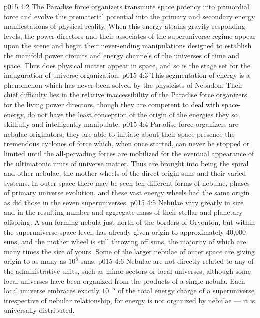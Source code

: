 \vs p015 4:2 The Paradise force organizers transmute space potency into primordial force and evolve this prematerial potential into the primary and secondary energy manifestations of physical reality. When this energy attains gravity\hyp{}responding levels, the power directors and their associates of the superuniverse regime appear upon the scene and begin their never\hyp{}ending manipulations designed to establish the manifold power circuits and energy channels of the universes of time and space. Thus does physical matter appear in space, and so is the stage set for the inauguration of universe organization.
\vs p015 4:3 This segmentation of energy is a phenomenon which has never been solved by the physicists of Nebadon. Their chief difficulty lies in the relative inaccessibility of the Paradise force organizers, for the living power directors, though they are competent to deal with space\hyp{}energy, do not have the least conception of the origin of the energies they so skillfully and intelligently manipulate.
\vs p015 4:4 \pc Paradise force organizers are nebulae originators; they are able to initiate about their space presence the tremendous cyclones of force which, when once started, can never be stopped or limited until the all\hyp{}pervading forces are mobilized for the eventual appearance of the ultimatonic units of universe matter. Thus are brought into being the spiral and other nebulae, the mother wheels of the direct\hyp{}origin suns and their varied systems. In outer space there may be seen ten different forms of nebulae, phases of primary universe evolution, and these vast energy wheels had the same origin as did those in the seven superuniverses.
\vs p015 4:5 \pc Nebulae vary greatly in size and in the resulting number and aggregate mass of their stellar and planetary offspring. A sun\hyp{}forming nebula just north of the borders of Orvonton, but within the superuniverse space level, has already given origin to approximately 40,000 suns, and the mother wheel is still throwing off suns, the majority of which are many times the size of yours. Some of the larger nebulae of outer space are giving origin to as many as $10^8$ suns.
\vs p015 4:6 Nebulae are not directly related to any of the administrative units, such as minor sectors or local universes, although some local universes have been organized from the products of a single nebula. Each local universe embraces exactly $10^{-5}$ of the total energy charge of a superuniverse irrespective of nebular relationship, for energy is not organized by nebulae --- it is universally distributed.
